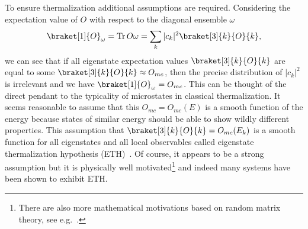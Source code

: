To ensure thermalization additional assumptions are required. Considering the expectation value of $O$ with respect to the diagonal ensemble $\omega$
\begin{equation}
	\braket[1]{O}_{\omega} = \Tr O \omega = \sum_k |c_k|^2 \braket[3]{k}{O}{k},
\end{equation}
we can see that if all eigenstate expectation values $\braket[3]{k}{O}{k}$ are equal to some $\braket[3]{k}{O}{k}\approx O_{mc}$, then the precise distribution of $|c_k|^2$ is irrelevant and we have $\braket[1]{O}_{\omega} = O_{mc}$. This can be thought of the direct pendant to the typicality of microstates in classical thermalization. It seems reasonable to assume that this $O_{mc}=O_{mc}(E)$ is a smooth function of the energy because states of similar energy should be able to show wildly different properties. 
This assumption that $\braket[3]{k}{O}{k}=O_{mc}(E_k)$ is a smooth function for all eigenstates and all local observables called eigenstate thermalization hypothesis (ETH)~\cite{deutschQuantumStatisticalMechanics1991,srednickiChaosQuantumThermalization1994,rigolThermalizationItsMechanism2008}. Of course, it appears to be a strong assumption but it is physically well motivated\footnote{There are also more mathematical motivations based on random matrix theory, see e.g.~\cite{dalessioQuantumChaosEigenstate2016}.} and indeed many systems have been shown to exhibit ETH.

